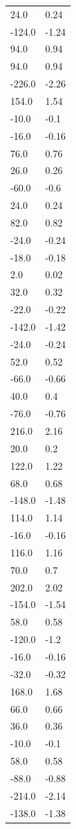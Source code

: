 \begin{longtable}{ll}
24.0 & 0.24 \\
-124.0 & -1.24 \\
94.0 & 0.94 \\
94.0 & 0.94 \\
-226.0 & -2.26 \\
154.0 & 1.54 \\
-10.0 & -0.1 \\
-16.0 & -0.16 \\
76.0 & 0.76 \\
26.0 & 0.26 \\
-60.0 & -0.6 \\
24.0 & 0.24 \\
82.0 & 0.82 \\
-24.0 & -0.24 \\
-18.0 & -0.18 \\
2.0 & 0.02 \\
32.0 & 0.32 \\
-22.0 & -0.22 \\
-142.0 & -1.42 \\
-24.0 & -0.24 \\
52.0 & 0.52 \\
-66.0 & -0.66 \\
40.0 & 0.4 \\
-76.0 & -0.76 \\
216.0 & 2.16 \\
20.0 & 0.2 \\
122.0 & 1.22 \\
68.0 & 0.68 \\
-148.0 & -1.48 \\
114.0 & 1.14 \\
-16.0 & -0.16 \\
116.0 & 1.16 \\
70.0 & 0.7 \\
202.0 & 2.02 \\
-154.0 & -1.54 \\
58.0 & 0.58 \\
-120.0 & -1.2 \\
-16.0 & -0.16 \\
-32.0 & -0.32 \\
168.0 & 1.68 \\
66.0 & 0.66 \\
36.0 & 0.36 \\
-10.0 & -0.1 \\
58.0 & 0.58 \\
-88.0 & -0.88 \\
-214.0 & -2.14 \\
-138.0 & -1.38 \\

\end{longtable}

